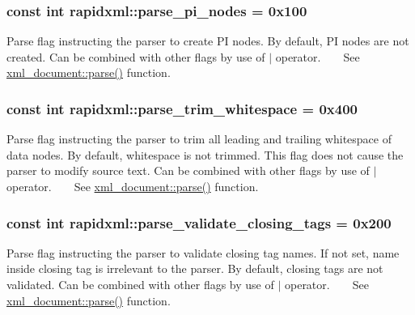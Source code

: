 \subsubsection[{parse\+\_\+pi\+\_\+nodes}]{\setlength{\rightskip}{0pt plus 5cm}const int rapidxml\+::parse\+\_\+pi\+\_\+nodes = 0x100}\label{namespacerapidxml_a03fe68fcf5d28f38476e0fd31adecc4c}
Parse flag instructing the parser to create P\+I nodes. By default, P\+I nodes are not created. Can be combined with other flags by use of $\vert$ operator. ~\newline
~\newline
 See \hyperlink{classrapidxml_1_1xml__document_ac6e73ff9ac323bf5a370c38feb03a6b1}{xml\+\_\+document\+::parse()} function. \hypertarget{namespacerapidxml_a61912424b47db5038e726d4e1c22417f}{}
\subsubsection[{parse\+\_\+trim\+\_\+whitespace}]{\setlength{\rightskip}{0pt plus 5cm}const int rapidxml\+::parse\+\_\+trim\+\_\+whitespace = 0x400}\label{namespacerapidxml_a61912424b47db5038e726d4e1c22417f}
Parse flag instructing the parser to trim all leading and trailing whitespace of data nodes. By default, whitespace is not trimmed. This flag does not cause the parser to modify source text. Can be combined with other flags by use of $\vert$ operator. ~\newline
~\newline
 See \hyperlink{classrapidxml_1_1xml__document_ac6e73ff9ac323bf5a370c38feb03a6b1}{xml\+\_\+document\+::parse()} function. \hypertarget{namespacerapidxml_a7ce8f40fda68338e20b56f41e48e49f3}{}
\subsubsection[{parse\+\_\+validate\+\_\+closing\+\_\+tags}]{\setlength{\rightskip}{0pt plus 5cm}const int rapidxml\+::parse\+\_\+validate\+\_\+closing\+\_\+tags = 0x200}\label{namespacerapidxml_a7ce8f40fda68338e20b56f41e48e49f3}
Parse flag instructing the parser to validate closing tag names. If not set, name inside closing tag is irrelevant to the parser. By default, closing tags are not validated. Can be combined with other flags by use of $\vert$ operator. ~\newline
~\newline
 See \hyperlink{classrapidxml_1_1xml__document_ac6e73ff9ac323bf5a370c38feb03a6b1}{xml\+\_\+document\+::parse()} function. \hypertarget{namespacerapidxml_a65477b812a80f5bda693ec57e57de064}{}
